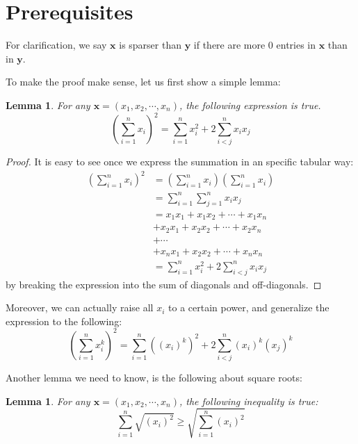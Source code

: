 \documentclass[11pt]{article}
\newtheorem{lemma}[theorem]{Lemma}
\begin{document}
\section{Prerequisites}
For clarification, we say $\bm{x}$ is sparser than $\bm{y}$ if there are more 0 entries in $\bm{x}$ than in $\bm{y}$. 

To make the proof make sense, let us first show a simple lemma:
\begin{lemma}\label{eq:4}
    For any $\bm{x} = (x_1, x_2, \cdots, x_n)$, the following expression is true. 
    \begin{equation}
        (\sum^n_{i=1} x_i)^2 = \sum^n_{i=1} x_i^2 + 2\sum^n_{i < j} x_ix_j
    \end{equation}
\end{lemma}
\begin{proof}
    It is easy to see once we express the summation in an specific tabular way:
    \begin{align*}
        (\sum^n_{i=1} x_i)^2 
        &= (\sum^n_{i=1} x_i)(\sum^n_{i=1} x_i) \\
        &= \sum^n_{i=1} \sum^n_{j=1} x_i x_j \\
        &= x_1x_1 + x_1x_2 + \cdots + x_1x_n \\
        & + x_2x_1 + x_2x_2 + \cdots + x_2x_n \\ 
        & + \cdots \\
        & + x_nx_1 + x_2x_2 + \cdots + x_nx_n \\
        & = \sum^n_{i=1} x_i^2 + 2\sum^n_{i < j} x_ix_j
    \end{align*}
    by breaking the expression into the sum of diagonals and off-diagonals.
\end{proof}

Moreover, we can actually raise all $x_{i}$ to a certain power, and generalize the expression to the following:
\begin{equation}
	(\sum^n_{i=1} x_i^{k})^2 = \sum^n_{i=1} ((x_i)^{k})^2 + 2\sum^n_{i < j} (x_i)^{k}(x_j)^{k}
\end{equation}

Another lemma we need to know, is the following about square roots:
\begin{lemma} For any $\bm{x} = (x_1, x_2, \cdots, x_n)$, the following inequality is true:
    \begin{equation}\label{eq:5}
        \sum^n_{i=1} \sqrt{(x_i)^2} \geq \sqrt{\sum^n_{i=1} (x_i)^2} 
    \end{equation}
\end{lemma}
\end{document}
